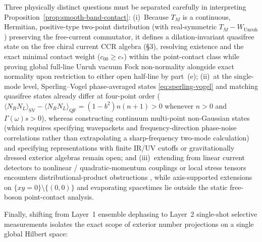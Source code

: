 \documentclass[11pt,a4paper]{article}
\theoremstyle{definition}
\theoremstyle{remark}
\newcommand{\1}{\mathbf{1}}
\begin{document}
Three physically distinct questions must be separated carefully in interpreting Proposition~\ref{prop:smooth-band-contact}:
(i)~Because $T_M$ is a continuous, Hermitian, positive-type two-point distribution (with real-symmetric $T_M-W_{\mathrm{Unruh}}$) preserving the free-current commutator, it defines a dilation-invariant quasifree state on the free chiral current CCR algebra \cite{ArakiShiraishi1971} (\S3), resolving existence and the exact minimal contact weight ($c_{00}\ge c_*$) within the point-contact class while proving global full-line Unruh vacuum Fock non-normality alongside exact normality upon restriction to either open half-line by part~(e);
(ii)~at the single-mode level, Sperling--Vogel phase-averaged states \eqref{eq:sperling-vogel} and matching quasifree states already differ at four-point order ($\langle N_R N_L\rangle_{\mathrm{SV}} - \langle N_R N_L\rangle_{\mathrm{QF}} = (1-b^2)n(n+1) > 0$ whenever $n>0$ and $\Gamma(\omega)s>0$), whereas constructing continuum multi-point non-Gaussian states (which requires specifying wavepackets and frequency-direction phase-noise correlations rather than extrapolating a sharp-frequency two-mode calculation) and specifying representations with finite IR/UV cutoffs or gravitationally dressed exterior algebras remain open; and
(iii)~extending from linear current detectors to nonlinear / quadratic-momentum couplings or local stress tensors encounters distributional-product obstructions \cite{Zambianco2026}, while axis-supported extensions on $\{xy=0\}\setminus\{(0,0)\}$ and evaporating spacetimes lie outside the static free-boson point-contact analysis.

Finally, shifting from Layer~1 ensemble dephasing to Layer~2 single-shot selective measurements isolates the exact scope of exterior number projections on a single global Hilbert space:
\end{document}
